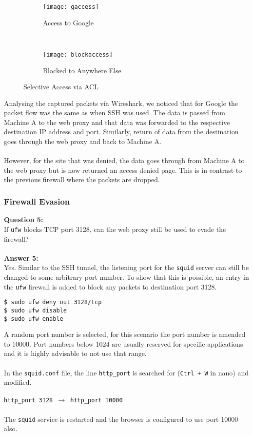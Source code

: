 \documentclass[a4paper,12pt]{article}
\begin{document}
\begin{figure}[H]
\begin{subfigure}{0.45\textwidth}
\centering
\texttt{[image: gaccess]}
\caption{Access to Google}
\label{fig:blockaccess}
\end{subfigure}
~
\begin{subfigure}{0.45\textwidth}
\centering
\texttt{[image: blockaccess]}
\caption{Blocked to Anywhere Else}
\label{fig:gaccess}
\end{subfigure}
\caption{Selective Access via ACL}
\end{figure}
\noindent Analysing the captured packets via Wireshark, we noticed that for Google the packet flow was the same as when SSH was used. The data is passed from Machine A to the web proxy and that data was forwarded to the respective destination IP address and port. Similarly, return of data from the destination goes through the web proxy and back to Machine A.\\\\However, for the site that was denied, the data goes through from Machine A to the web proxy but is now returned an access denied page. This is in contrast to the previous firewall where the packets are dropped.
\subsubsection{Firewall Evasion}
\textbf{Question 5:}\\If \texttt{ufw} blocks TCP port 3128, can the web proxy still be used to evade the firewall?\\\\\textbf{Answer 5:}\\Yes. Similar to the SSH tunnel, the listening port for the \texttt{squid} server can still be changed to some arbitrary port number. To show that this is possible, an entry in the \texttt{ufw} firewall is added to block any packets to destination port 3128.
\begin{verbatim}
$ sudo ufw deny out 3128/tcp
$ sudo ufw disable
$ sudo ufw enable 
\end{verbatim}
\noindent A random port number is selected, for this scenario the port number is amended to 10000. Port numbers below 1024 are usually reserved for specific applications and it is highly advisable to not use that range.\\\\
In the \texttt{squid.conf} file, the line \texttt{http\_port} is searched for (\texttt{Ctrl + W} in nano) and modified.\\\\
\texttt{http\_port 3128 $\rightarrow$ http\_port 10000}\\\\
The \texttt{squid} service is restarted and the browser is configured to use port 10000 also.
\end{document}
